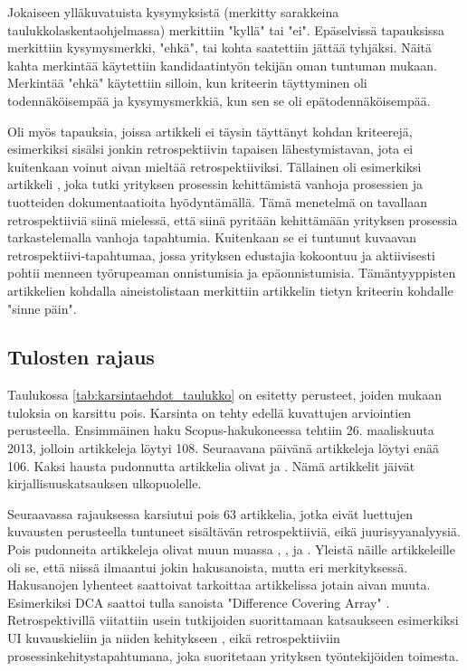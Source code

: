 Jokaiseen ylläkuvatuista kysymyksistä (merkitty sarakkeina taulukkolaskentaohjelmassa) merkittiin "kyllä" tai "ei". Epäselvissä tapauksissa merkittiin kysymysmerkki, "ehkä", tai kohta saatettiin jättää tyhjäksi. Näitä kahta merkintää käytettiin kandidaatintyön tekijän oman tuntuman mukaan. Merkintää "ehkä" käytettiin silloin, kun kriteerin täyttyminen oli todennäköisempää ja kysymysmerkkiä, kun sen se oli epätodennäköisempää. 

Oli myös tapauksia, joissa artikkeli ei täysin täyttänyt kohdan kriteerejä, esimerkiksi sisälsi jonkin retrospektiivin tapaisen lähestymistavan, jota ei kuitenkaan voinut aivan mieltää retrospektiiviksi. Tällainen oli esimerkiksi artikkeli \citep{cook1998cost}, joka tutki yrityksen prosessin kehittämistä vanhoja prosessien ja tuotteiden dokumentaatioita hyödyntämällä. Tämä menetelmä on tavallaan retrospektiiviä siinä mielessä, että siinä pyritään kehittämään yrityksen prosessia tarkastelemalla vanhoja tapahtumia. Kuitenkaan se ei tuntunut kuvaavan retrospektiivi-tapahtumaa, jossa yrityksen edustajia kokoontuu ja aktiivisesti pohtii menneen työrupeaman onnistumisia ja epäonnistumisia. Tämäntyyppisten artikkelien kohdalla aineistolistaan merkittiin artikkelin tietyn kriteerin kohdalle "sinne päin". 

\subsection{Tulosten rajaus}
Taulukossa \ref{tab:karsintaehdot_taulukko} on esitetty perusteet, joiden mukaan tuloksia on karsittu pois. Karsinta on tehty edellä kuvattujen arviointien perusteella. Ensimmäinen haku Scopus-hakukoneessa tehtiin 26. maaliskuuta 2013, jolloin artikkeleja löytyi 108. Seuraavana päivänä artikkeleja löytyi enää 106. Kaksi hausta pudonnutta artikkelia olivat \citep{bolosky2007farsite} ja \citep{dreiseitl2005nomographic}. Nämä artikkelit jäivät kirjallisuuskatsauksen ulkopuolelle.

Seuraavassa rajauksessa karsiutui pois 63 artikkelia, jotka eivät luettujen kuvausten perusteella tuntuneet sisältävän retrospektiiviä, eikä juurisyyanalyysiä. Pois pudonneita artikkeleja olivat muun muassa \citep{yang2012personalized}, \citep{ji2010constructions}, \citep{helms2008retrospective} ja \citep{richardson2006developing}. Yleistä näille artikkeleille oli se, että niissä ilmaantui jokin hakusanoista, mutta eri merkityksessä. Hakusanojen lyhenteet saattoivat tarkoittaa artikkelissa jotain aivan muuta. Esimerkiksi DCA saattoi tulla sanoista "Difference Covering Array" \citep{ji2010constructions}. Retrospektivillä viitattiin usein tutkijoiden suorittamaan katsaukseen esimerkiksi UI kuvauskieliin ja niiden kehitykseen \citep{helms2008retrospective}, eikä retrospektiiviin prosessinkehitystapahtumana, joka suoritetaan yrityksen työntekijöiden toimesta.

